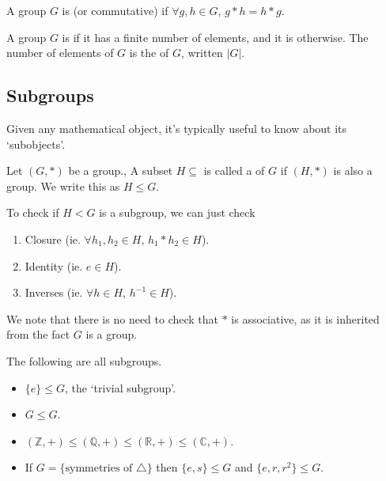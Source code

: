 \documentclass[a4]{scrartcl}
\begin{document}
\begin{definition}
	A group $G$ is  (or commutative) if $\forall g, h \in G$, $g * h = h * g$.
\end{definition}

\begin{definition}
	A group $G$ is  if it has a finite number of elements, and it is  otherwise. The number of elements of $G$ is the  of $G$, written $|G|$.
\end{definition}

\subsection{Subgroups}

Given any mathematical object, it's typically useful to know about its `subobjects'.

\begin{definition}
	Let $(G, *)$ be a group., A subset $H \subseteq$ is called a  of $G$ if $(H, *)$ is also a group. We write this as $H \leq G$.
\end{definition}

\begin{remark}
	To check if $H < G$ is a subgroup, we can just check
	\begin{enumerate}
		\item Closure (ie. $\forall h_1, h_2 \in H$, $h_1 * h_2 \in H$).
		\item Identity (ie. $e \in H$).
		\item Inverses (ie. $\forall h \in H$, $h^{-1} \in H$).
	\end{enumerate}
	We note that there is no need to check that $*$ is associative, as it is inherited from the fact $G$ is a group.
\end{remark}

\begin{example}
	The following are all subgroups.
	\begin{itemize}
		\item $\{e\} \leq G$, the `trivial subgroup'.
		\item $G \leq G$.
		\item $(\mathbb{Z}, +) \leq (\mathbb{Q}, +) \leq (\mathbb{R}, +) \leq (\mathbb{C}, +)$.
		\item If $G = \{\text{symmetries of }\triangle\}$ then $\{e, s\} \leq G$ and $\{ e, r, r^2 \} \leq G$.
	\end{itemize}
\end{example}
\end{document}

